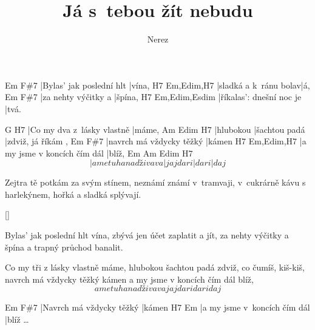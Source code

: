 \documentclass{song}
\author{Nerez}
\title{Já s~tebou žít nebudu}
\begin{document}
\strophe
Em                       F\#7
|Bylas' jak poslední hlt |vína,
H7                    Em,Edim,H7
|sladká a k~ránu bolav|á,
Em                  F\#7
|za nehty výčitky a |špína,
H7                       Em,Edim,Esdim
|říkalas': dnešní noc je |tvá.
\endstrophe

G                          H7
|Co my dva z~lásky vlastně |máme,
Am        Edim          H7
|hlubokou |šachtou padá |zdviž, já říkám ,
Em                       F\#7
|navrch má vždycky těžký |kámen
H7                           Em,Edim,H7
|a my jsme v koncích čím dál |blíž,
   Em                     Am        Edim  H7
\[ |a me tu ha nadži vava |jaj dari |dari |daj \]
\endstrophe

\strophe*
Zejtra tě potkám za svým stínem, 
neznámí známí v~tramvaji, 
v~cukrárně kávu s harlekýnem, 
hořká a sladká splývají. 
\endstrophe

\ref{}

\strophe*
Bylas' jak poslední hlt vína,
zbývá jen účet zaplatit a jít,
za nehty výčitky a špína
a trapný průchod banalit.
\endstrophe

Co my tři z lásky vlastně máme, 
hlubokou šachtou padá zdviž, co čumíš, kiš-kiš, 
navrch má vždycky těžký kámen 
a my jsme v koncích čím dál blíž, 
\[ a me tu ha nadži vava jaj dari dari daj \]
\endstrophe

\strophe
Em                       F\#7
|Navrch má vždycky těžký |kámen
H7                           Em
|a my jsme v~koncích čím dál |blíž \ldots{}
\endstrophe
\end{document}
